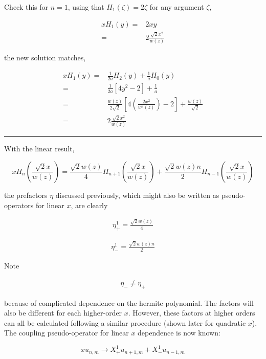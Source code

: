 \documentclass[aps,twoside,secnumarabic,balancelastpage,amsmath,amssymb,nofootinbib,hyperref=pdftex]{revtex4}
\begin{document}
Check this for $n=1$, using that $H_1(\zeta) = 2 \zeta$ for any argument $\zeta$,

\begin{align*}
xH_1(y) =&
2xy \\=& 2\frac{\sqrt{2 } x^2}{w(z)}
\end{align*}

the new solution matches,

\begin{align*}
x H_1(y) =&
	 \frac{1}{2a}H_{2}(y) +  \frac{1}{a} H_{0}(y)
	 \\=&
	 \frac{1}{2a}
	 [
	 4y^2 - 2
	 ]
	 +
	\frac{1}{a}
	 \\=&
	 \frac{w(z)}{2 \sqrt{2} }
	 [
	 4(\frac{2x^2}{w^2(z)}) - 2
	 ]
	 +
	 \frac{w(z)}{\sqrt{2} }	 
	 \\=&
	 2\frac{\sqrt{2 } x^2}{w(z)}
\end{align*}

\rule{\textwidth}{0.4pt}

With the linear result, 

\begin{equation*}
x H_n(\frac{\sqrt{2}x}{w(z)}) =
	\frac{\sqrt{2} w(z)}{4}
	H_{n+1}(\frac{\sqrt{2}x}{w(z)})
	+
	\frac{\sqrt{2} w(z) n}{2} H_{n-1} (\frac{\sqrt{2}x}{w(z)})
\end{equation*}

the prefactors $\eta$ discussed previously, which might also be written as pseudo-operators for linear $x$, are clearly

\begin{align*}
\eta_+^1 = \frac{\sqrt{2}w(z)}{4}
\end{align*}

\begin{align*}
\eta_-^1 = \frac{\sqrt{2} w(z) n}{2}
\end{align*}

Note

\begin{align*}
	\eta_- \neq \eta_+
\end{align*}

because of complicated dependence on the hermite polynomial. The factors will also be different for each higher-order $x$. However, these factors at higher orders can all be calculated following a similar procedure (shown later for quadratic $x$). \\

The coupling pseudo-operator for linear $x$ dependence is now known:


\begin{equation*}
x u_{n,m} \rightarrow
	X_+^1
	u_{n+1,m}
	+
	X_-^1
	u_{n-1,m}
\end{equation*}
\end{document}
